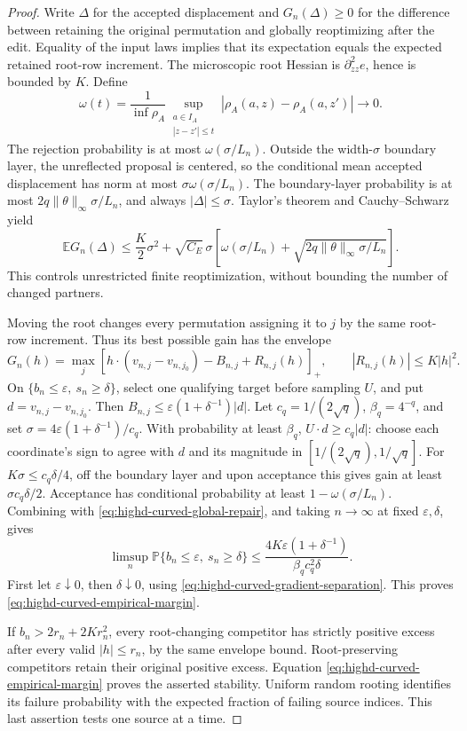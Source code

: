 \documentclass[11pt,reqno]{amsart}
\theoremstyle{definition}
\theoremstyle{remark}
\numberwithin{equation}{section}
\newcommand{\E}{\mathbb E}
\newcommand{\Pp}{\mathbb P}
\begin{document}
\begin{proof}
Write \(\Delta\) for the accepted displacement and
\(G_n(\Delta)\ge0\) for the difference between retaining the original
permutation and globally reoptimizing after the edit. Equality of
the input laws implies that its expectation equals the expected
retained root-row increment. The microscopic root Hessian is
\(\partial_{zz}^2e\), hence is bounded by \(K\). Define
\[
 \omega(t)=\frac{1}{\inf\rho_A}
   \sup_{\substack{a\in I_A\\|z-z'|\le t}}
       |\rho_A(a,z)-\rho_A(a,z')|\longrightarrow0.
\]
The rejection probability is at most \(\omega(\sigma/L_n)\).
Outside the width-\(\sigma\) boundary layer, the unreflected
proposal is centered, so the conditional mean accepted displacement
has norm at most \(\sigma\omega(\sigma/L_n)\).
The boundary-layer probability is at most
\(2q\|\theta\|_\infty\sigma/L_n\), and always
\(|\Delta|\le\sigma\). Taylor's theorem and Cauchy--Schwarz yield
\begin{equation}
 \E G_n(\Delta)\le
 \frac K2\sigma^2+\sqrt{C_E}\,\sigma
 \left[\omega(\sigma/L_n)
       +\sqrt{2q\|\theta\|_\infty\sigma/L_n}\right].
 \label{eq:highd-curved-global-repair}
\end{equation}
This controls unrestricted finite reoptimization, without bounding
the number of changed partners.

Moving the root changes every permutation assigning it to \(j\)
by the same root-row increment. Thus its best possible gain has
the envelope
\[
 G_n(h)=\max_j
   [h\cdot(v_{n,j}-v_{n,j_0})-B_{n,j}+R_{n,j}(h)]_+,
 \qquad |R_{n,j}(h)|\le K|h|^2 .
\]
On \(\{b_n\le\varepsilon,\ s_n\ge\delta\}\), select one
qualifying target before sampling \(U\), and put
\(d=v_{n,j}-v_{n,j_0}\).
Then \(B_{n,j}\le\varepsilon(1+\delta^{-1})|d|\).
Let \(c_q=1/(2\sqrt q)\), \(\beta_q=4^{-q}\), and set
\(\sigma=4\varepsilon(1+\delta^{-1})/c_q\).
With probability at least \(\beta_q\),
\(U\cdot d\ge c_q|d|\): choose each coordinate's sign to agree
with \(d\) and its magnitude in
\([1/(2\sqrt q),1/\sqrt q]\).
For \(K\sigma\le c_q\delta/4\), off the boundary layer and
upon acceptance this gives gain at least
\(\sigma c_q\delta/2\). Acceptance has conditional probability
at least \(1-\omega(\sigma/L_n)\).
Combining with \eqref{eq:highd-curved-global-repair}, and taking
\(n\to\infty\) at fixed \(\varepsilon,\delta\), gives
\[
 \limsup_n\Pp\{b_n\le\varepsilon,\ s_n\ge\delta\}
 \le \frac{4K\varepsilon(1+\delta^{-1})}
            {\beta_q c_q^2\delta}.
\]
First let \(\varepsilon\downarrow0\), then
\(\delta\downarrow0\), using
\eqref{eq:highd-curved-gradient-separation}. This proves
\eqref{eq:highd-curved-empirical-margin}.

If \(b_n>2r_n+2Kr_n^2\), every root-changing competitor has
strictly positive excess after every valid \(|h|\le r_n\), by
the same envelope bound. Root-preserving competitors retain
their original positive excess. Equation
\eqref{eq:highd-curved-empirical-margin} proves the asserted
stability. Uniform random rooting identifies its failure
probability with the expected fraction of failing source indices.
This last assertion tests one source at a time.
\end{proof}
\end{document}
